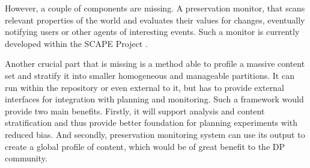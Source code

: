 However, a couple of components are missing. A preservation monitor, that scans relevant properties of the world and evaluates their values for changes, eventually notifying users or other agents of interesting events. Such a monitor is currently developed within the SCAPE Project \cite{becker-ipres2012}.

Another crucial part that is missing is a method able to profile a massive content set and stratify it into smaller homogeneous and manageable partitions. It can run within the repository or even external to it, but has to provide external interfaces for integration with planning and monitoring. Such a framework would provide two main benefits. Firstly, it will support analysis and content stratification and thus provide better foundation for planning experiments with reduced bias. And secondly, preservation monitoring system can use its output to create a global profile of content, which would be of great benefit to the DP community.